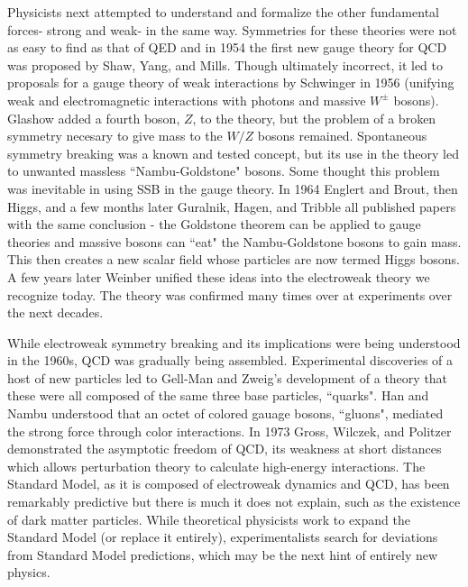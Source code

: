 Physicists next attempted to understand and formalize the other fundamental forces- strong and weak- in the same way. Symmetries for these theories were not as easy to find as that of QED and in 1954 the first new gauge theory for QCD was proposed by Shaw, Yang, and Mills. Though ultimately incorrect, it led to proposals for a gauge theory of weak interactions by Schwinger in 1956 (unifying weak and electromagnetic interactions with photons and massive $W^\pm$ bosons). Glashow added a fourth boson, $Z$, to the theory, but the problem of a broken symmetry necesary to give mass to the $W/Z$ bosons remained. Spontaneous symmetry breaking was a known and tested concept, but its use in the theory led to unwanted massless ``Nambu-Goldstone" bosons. Some thought this problem was inevitable in using SSB in the gauge theory. In 1964 Englert and Brout, then Higgs, and a few months later Guralnik, Hagen, and Tribble all published papers with the same conclusion - the Goldstone theorem can be applied to gauge theories and massive bosons can ``eat" the Nambu-Goldstone bosons to gain mass. This then creates a new scalar field whose particles are now termed Higgs bosons. A few years later Weinber unified these ideas into the electroweak theory we recognize today. The theory was confirmed many times over at experiments over the next decades. 

While electroweak symmetry breaking and its implications were being understood in the 1960s, QCD was gradually being assembled. Experimental discoveries of a host of new particles led to Gell-Man and Zweig's development of a theory that these were all composed of the same three base particles, ``quarks". Han and Nambu understood that an octet of colored gauage bosons, ``gluons", mediated the strong force through color interactions. In 1973 Gross, Wilczek, and Politzer demonstrated the asymptotic freedom of QCD, its weakness at short distances which allows perturbation theory to calculate high-energy interactions. The Standard Model, as it is composed of electroweak dynamics and QCD, has been remarkably predictive but there is much it does not explain, such as the existence of dark matter particles. While theoretical physicists work to expand the Standard Model (or replace it entirely), experimentalists search for deviations from Standard Model predictions, which may be the next hint of entirely new physics. 

